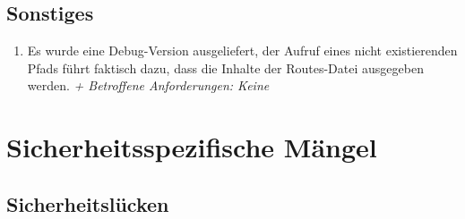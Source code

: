 \documentclass[12pt,DIV14,BCOR10mm,a4paper,parskip=half-,headsepline,headinclude,english,ngerman,bibliography=totocnumbered]{scrreprt}
\begin{document}
\section{Sonstiges}

\begin{enumerate}[resume]


 
  

  
  
  \item Es wurde eine Debug-Version ausgeliefert, der Aufruf eines nicht existierenden Pfads führt faktisch dazu, dass die Inhalte der Routes-Datei ausgegeben werden.
  \textit{+ Betroffene Anforderungen: Keine} 
 
  
\end{enumerate}

\chapter{Sicherheitsspezifische Mängel}

\section{Sicherheitslücken}
\end{document}
